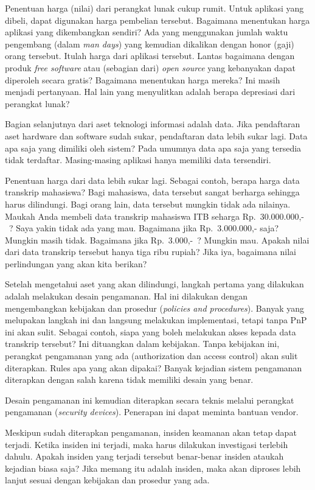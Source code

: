 Penentuan harga (nilai) dari perangkat lunak cukup rumit. Untuk aplikasi yang
dibeli, dapat digunakan harga pembelian tersebut. Bagaimana menentukan harga
aplikasi yang dikembangkan sendiri? Ada yang menggunakan jumlah waktu
pengembang (dalam {\em man days}) yang kemudian dikalikan dengan honor (gaji)
orang tersebut. Itulah harga dari aplikasi tersebut. Lantas bagaimana dengan
produk {\em free software} atau (sebagian dari) {\em open source} yang
kebanyakan dapat diperoleh secara gratis? Bagaimana menentukan harga mereka?
Ini masih menjadi pertanyaan. Hal lain yang menyulitkan adalah berapa
depresiasi dari perangkat lunak?

Bagian selanjutnya dari aset teknologi informasi adalah data. Jika pendaftaran
aset hardware dan software sudah sukar, pendaftaran data lebih sukar lagi. Data
apa saja yang dimiliki oleh sistem? Pada umumnya data apa saja yang tersedia
tidak terdaftar. Masing-masing aplikasi hanya memiliki data tersendiri.

Penentuan harga dari data lebih sukar lagi. Sebagai contoh, berapa harga data
transkrip mahasiswa? Bagi mahasiswa, data tersebut sangat berharga sehingga
harus dilindungi. Bagi orang lain, data tersebut mungkin tidak ada nilainya.
Maukah Anda membeli data transkrip mahasiswa ITB seharga Rp.~30.000.000,-~?
Saya yakin tidak ada yang mau. Bagaimana jika Rp.~3.000.000,- saja? Mungkin
masih tidak. Bagaimana jika Rp.~3.000,-~? Mungkin mau. Apakah nilai dari data
transkrip tersebut hanya tiga ribu rupiah? Jika iya, bagaimana nilai
perlindungan yang akan kita berikan?


Setelah mengetahui aset yang akan dilindungi, langkah pertama yang dilakukan
adalah melakukan desain pengamanan. Hal ini dilakukan dengan mengembangkan
kebijakan dan prosedur ({\em policies and procedures}). Banyak yang melupakan
langkah ini dan langsung melakukan implementasi, tetapi tanpa PnP ini akan
sulit. Sebagai contoh, siapa yang boleh melakukan akses kepada data transkrip
tersebut? Ini dituangkan dalam kebijakan. Tanpa kebijakan ini, perangkat
pengamanan yang ada (authorization dan access control) akan sulit diterapkan.
Rules apa yang akan dipakai? Banyak kejadian sistem pengamanan diterapkan
dengan salah karena tidak memiliki desain yang benar.

Desain pengamanan ini kemudian diterapkan secara teknis melalui perangkat
pengamanan ({\em security devices}). Penerapan ini dapat meminta bantuan
vendor. 

Meskipun sudah diterapkan pengamanan, insiden keamanan akan tetap dapat
terjadi. Ketika insiden ini terjadi, maka harus dilakukan investigasi terlebih
dahulu. Apakah insiden yang terjadi tersebut benar-benar insiden ataukah
kejadian biasa saja? Jika memang itu adalah insiden, maka akan diproses lebih
lanjut sesuai dengan kebijakan dan prosedur yang ada.


